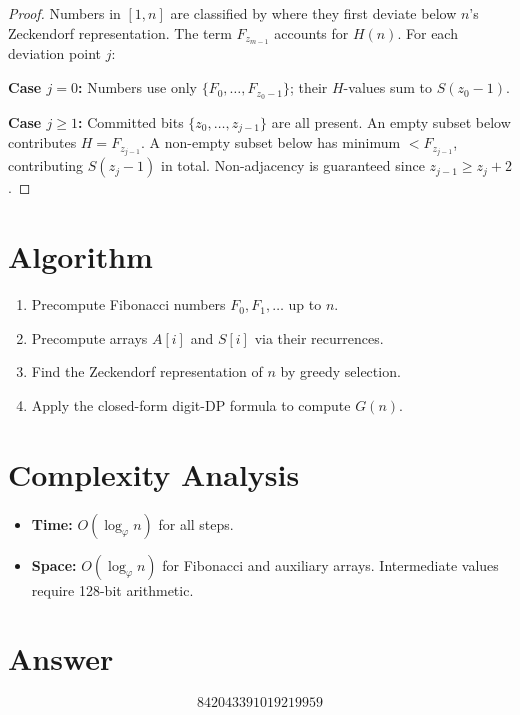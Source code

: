 \documentclass[11pt]{article}
\begin{document}
\begin{proof}
Numbers in $[1, n]$ are classified by where they first deviate below $n$'s Zeckendorf representation. The term $F_{z_{m-1}}$ accounts for $H(n)$. For each deviation point $j$:

\textbf{Case $j=0$:} Numbers use only $\{F_0, \ldots, F_{z_0 - 1}\}$; their $H$-values sum to $S(z_0 - 1)$.

\textbf{Case $j \geq 1$:} Committed bits $\{z_0, \ldots, z_{j-1}\}$ are all present. An empty subset below contributes $H = F_{z_{j-1}}$. A non-empty subset below has minimum $< F_{z_{j-1}}$, contributing $S(z_j - 1)$ in total. Non-adjacency is guaranteed since $z_{j-1} \geq z_j + 2$.
\end{proof}

\section{Algorithm}

\begin{enumerate}
    \item Precompute Fibonacci numbers $F_0, F_1, \ldots$ up to $n$.
    \item Precompute arrays $A[i]$ and $S[i]$ via their recurrences.
    \item Find the Zeckendorf representation of $n$ by greedy selection.
    \item Apply the closed-form digit-DP formula to compute $G(n)$.
\end{enumerate}

\section{Complexity Analysis}

\begin{itemize}
    \item \textbf{Time:} $O(\log_\varphi n)$ for all steps.
    \item \textbf{Space:} $O(\log_\varphi n)$ for Fibonacci and auxiliary arrays. Intermediate values require 128-bit arithmetic.
\end{itemize}

\section{Answer}

\[
\boxed{842043391019219959}
\]
\end{document}

